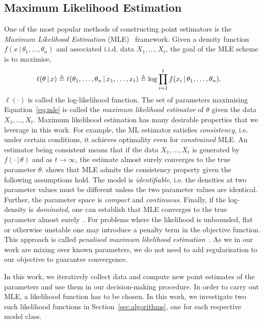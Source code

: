 \subsection{Maximum Likelihood Estimation}
One of the most popular methods of constructing point estimators is the \emph{Maximum Likelihood Estimation} (MLE)~\citep{casella2021statistical} framework. Given a density function $f(x \, | \, \theta_1, \hdots, \theta_n)$ and associated i.i.d. data $X_1, \hdots, X_t$, the goal of the MLE scheme is to maximise,
\begin{equation}\label{eq:mle}
\hspace*{-1em}  \ell(\theta \, | \, x) \triangleq \ell(\theta_1, \hdots, \theta_n \, | \, x_1, \hdots, x_t) \triangleq \log \prod_{i=1}^t f(x_i \, | \, \theta_1, \hdots, \theta_n).
\end{equation}
$\ell(\cdot)$ is called the log-likelihood function. The set of parameters maximising Equation~\ref{eq:mle} is called the \emph{maximum likelihood estimator} of $\theta$ given the data $X_1, \hdots, X_t$. Maximum likelihood estimation has many desirable properties that we leverage in this work. For example, the ML estimator satisfies \emph{consistency}, i.e. under certain conditions, it achieves optimality even for \emph{constrained} MLE. An estimator being consistent means that if the data $X_1, \hdots, X_t$ is generated by $f(\cdot \, | \, \theta)$ and as $t\rightarrow \infty$, the estimate almost surely converges to the true parameter $\theta$. \citep{kiefer1956consistency} shows that MLE admits the consistency property given the following assumptions hold. The model is \emph{identifiable}, i.e. the densities at two parameter values must be different unless the two parameter values are identical. Further, the parameter space is \emph{compact} and \emph{continuous}. Finally, if the log-density is \emph{dominated}, one can establish that MLE converges to the true parameter almost surely~\citep{newey1987asymmetric}.
For problems where the likelihood is unbounded, flat or otherwise unstable one may introduce a penalty term in the objective function. This approach is called \emph{penalised maximum likelihood estimation}~\citep{ciuperca2003penalized, ouhamma2022bilinear}. As we in our work are mixing over known parameters, we do not need to add regularisation to our objective to guarantee convergence.

In this work, we iteratively collect data and compute new point estimates of the parameters and use them in our decision-making procedure. In order to carry out MLE, a likelihood function has to be chosen. In this work, we investigate two such likelihood functions in Section~\ref{sec:algorithms}, one for each respective model class. 